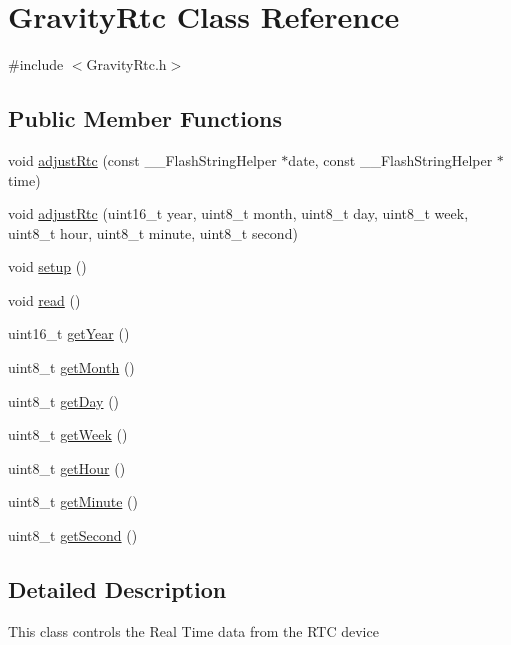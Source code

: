 \hypertarget{class_gravity_rtc}{}\section{Gravity\+Rtc Class Reference}
\label{class_gravity_rtc}


{\ttfamily \#include $<$Gravity\+Rtc.\+h$>$}

\subsection*{Public Member Functions}
\begin{DoxyCompactItemize}
\item 
void \hyperlink{class_gravity_rtc_af98ba41a948771253e5e936063a817d3}{adjust\+Rtc} (const \+\_\+\+\_\+\+Flash\+String\+Helper $\ast$date, const \+\_\+\+\_\+\+Flash\+String\+Helper $\ast$time)
\item 
void \hyperlink{class_gravity_rtc_afd60ca78ef607244348873630ccf9259}{adjust\+Rtc} (uint16\+\_\+t year, uint8\+\_\+t month, uint8\+\_\+t day, uint8\+\_\+t week, uint8\+\_\+t hour, uint8\+\_\+t minute, uint8\+\_\+t second)
\item 
void \hyperlink{class_gravity_rtc_ac4035c99a3e51f7b643628ab885c176b}{setup} ()
\item 
void \hyperlink{class_gravity_rtc_ab4d3d5800f67e1362502be92107cd8b9}{read} ()
\item 
uint16\+\_\+t \hyperlink{class_gravity_rtc_a35c000ff428ac2c0b46d1b490532b29f}{get\+Year} ()
\item 
uint8\+\_\+t \hyperlink{class_gravity_rtc_aaacf3ae5e3521206560f3a23b64030cd}{get\+Month} ()
\item 
uint8\+\_\+t \hyperlink{class_gravity_rtc_adb6f74357a48f49ac0596aac3f558c7d}{get\+Day} ()
\item 
uint8\+\_\+t \hyperlink{class_gravity_rtc_aa3d944f570e2906faad6ab4b1aa35372}{get\+Week} ()
\item 
uint8\+\_\+t \hyperlink{class_gravity_rtc_adae161e4945aacae87a82f7d03b33f3a}{get\+Hour} ()
\item 
uint8\+\_\+t \hyperlink{class_gravity_rtc_a42038ee8675d49eae74ce75ee8bd4fa9}{get\+Minute} ()
\item 
uint8\+\_\+t \hyperlink{class_gravity_rtc_afb1a44b11e84bec28ed72e1b73068e54}{get\+Second} ()
\end{DoxyCompactItemize}


\subsection{Detailed Description}
This class controls the Real Time data from the R\+TC device 

